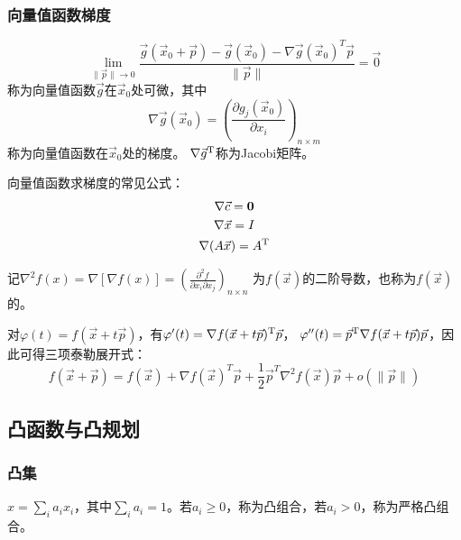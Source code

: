 \subsubsection{向量值函数梯度}

\begin{definition}[向量值函数可微]
    \[
        \lim _{\| \vec{p} \| \rightarrow 0} \frac{\vec{g}\left(\vec{x}_{0}+\vec{p}\right)-\vec{g}\left(\vec{x}_{0}\right)-\nabla \vec{g}\left(\vec{x}_{0}\right)^{T} \vec{p}}{\|\vec{p}\|}=\overrightarrow{0}
    \]
    称为向量值函数$\vec{g}$在$\vec{x}_0$处可微，其中
    \[
        \nabla \vec{g}(\vec{x}_0) = \left( \frac{\partial g_j(\vec{x}_0)}{\partial x_i} \right)_{n\times m}
    \]
    称为向量值函数在$\vec{x}_0$处的梯度。
    $\nabla\vec{g}^\mathrm{T}$称为Jacobi矩阵。
\end{definition}

向量值函数求梯度的常见公式：
\begin{gather*}
    \nabla \vec{c} = \bm{0} \\
    \nabla \vec{x} = I \\
    \nabla (A\vec{x}) = A^\mathrm{T} \\
\end{gather*}

\begin{definition}
    记$\nabla^2 f(x) = \nabla[\nabla f(x)] = \left( \frac{\partial^2 f}{\partial x_i \partial x_j} \right)_{n\times n}$
    为$f(\vec{x})$的二阶导数，也称为$f(\vec{x})$的。
\end{definition}

\begin{theorem}
    对$\varphi(t) = f(\vec{x}+t\vec{p})$，有$\varphi'(t)=\nabla f(\vec{x}+t\vec{p})^\mathrm{T} \vec{p}$，
    $\varphi''(t)=\vec{p}^\mathrm{T} \nabla f(\vec{x}+t\vec{p}) \vec{p}$，因此可得三项泰勒展开式：
    \[
        f(\vec{x}+\vec{p})=f(\vec{x})+\nabla f(\vec{x})^{T} \vec{p}+\frac{1}{2} \vec{p}^{T} \nabla^{2} f(\vec{x}) \vec{p}+o(\|\vec{p}\|)
    \]
\end{theorem}

\subsection{凸函数与凸规划}
\subsubsection{凸集}

\begin{definition}
    $x=\sum_i a_i x_i$，其中$\sum_i a_i=1$。若$a_i\geq 0$，称为凸组合，若$a_i>0$，称为严格凸组合。
\end{definition}

